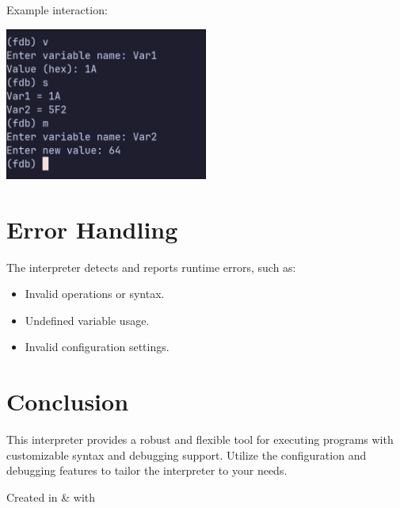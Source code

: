 \documentclass[a4paper,12pt]{article}
\begin{document}
Example interaction:
\begin{center}
	\includegraphics[width=0.5\textwidth]{assets/debugger.png}
\end{center}

\section{Error Handling}
The interpreter detects and reports runtime errors, such as:
\begin{itemize}
	\item Invalid operations or syntax.
	\item Undefined variable usage.
	\item Invalid configuration settings.
\end{itemize}

\section{Conclusion}
This interpreter provides a robust and flexible tool for executing programs with customizable syntax and debugging support. Utilize the configuration and debugging features to tailor the interpreter to your needs.
\vspace*{\fill}

\begin{center}Created in  \& 
	with \end{center}
\end{document}
